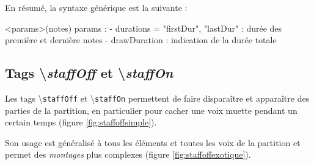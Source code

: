 \documentclass{article}
\newenvironment{gmncode}	{\vspace{-2mm}\small\verbatim}{\endverbatim\vspace{-2mm}}
\newcommand{\code}[1]		{{\small \texttt{#1}}}
\newcommand{\guidotag}[1]	{\textbackslash\code{#1}}
\begin{document}
En résumé, la syntaxe générique est la suivante :
\vspace{1mm}

\begin{gmncode}
  \fBeam<params>(notes)
  params : 
    - durations = "firstDur", "lastDur" : 
      durée des première et dernière notes
    - drawDuration : 
      indication de la durée totale
\end{gmncode}



\subsection{Tags \textbackslash{}\emph{staffOff} et \textbackslash{}\emph{staffOn}}\label{subsec:staffoff}


Les tags \guidotag{staffOff} et \guidotag{staffOn} permettent de faire disparaître et apparaître des parties de la partition, en particulier pour cacher une voix muette pendant un certain temps (figure \ref{fig:staffoffsimple}).

Son usage est généralisé à tous les éléments et toutes les voix de la partition et permet des \emph{montages} plus complexes (figure \ref{fig:staffoffexotique}).
\end{document}
